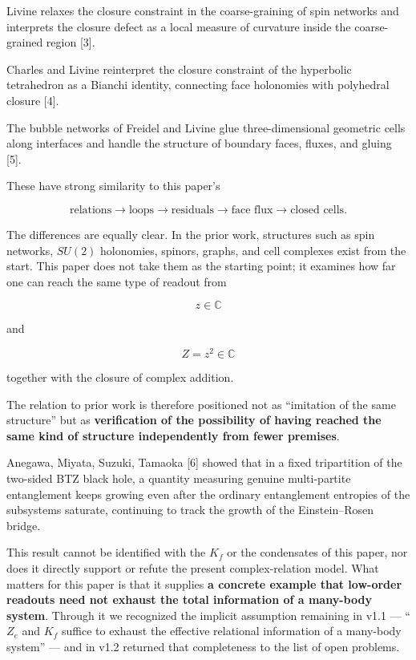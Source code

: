 \documentclass[
  a4paper,
]{article}
\begin{document}
Livine relaxes the closure constraint in the coarse-graining of spin
networks and interprets the closure defect as a local measure of
curvature inside the coarse-grained region {[}3{]}.

Charles and Livine reinterpret the closure constraint of the hyperbolic
tetrahedron as a Bianchi identity, connecting face holonomies with
polyhedral closure {[}4{]}.

The bubble networks of Freidel and Livine glue three-dimensional
geometric cells along interfaces and handle the structure of boundary
faces, fluxes, and gluing {[}5{]}.

These have strong similarity to this paper's

\[
\text{relations}\to\text{loops}\to\text{residuals}\to\text{face flux}\to\text{closed cells}.
\]

The differences are equally clear. In the prior work, structures such as
spin networks, \(SU(2)\) holonomies, spinors, graphs, and cell complexes
exist from the start. This paper does not take them as the starting
point; it examines how far one can reach the same type of readout from

\[
z\in\mathbb C
\]

and

\[
Z=z^2\in\mathbb C
\]

together with the closure of complex addition.

The relation to prior work is therefore positioned not as ``imitation of
the same structure'' but as \textbf{verification of the possibility of
having reached the same kind of structure independently from fewer
premises}.

Anegawa, Miyata, Suzuki, Tamaoka {[}6{]} showed that in a fixed
tripartition of the two-sided BTZ black hole, a quantity measuring
genuine multi-partite entanglement keeps growing even after the ordinary
entanglement entropies of the subsystems saturate, continuing to track
the growth of the Einstein--Rosen bridge.

This result cannot be identified with the \(K_f\) or the condensates of
this paper, nor does it directly support or refute the present
complex-relation model. What matters for this paper is that it supplies
\textbf{a concrete example that low-order readouts need not exhaust the
total information of a many-body system}. Through it we recognized the
implicit assumption remaining in v1.1 --- ``\(Z_e\) and \(K_f\) suffice
to exhaust the effective relational information of a many-body system''
--- and in v1.2 returned that completeness to the list of open problems.
\end{document}
